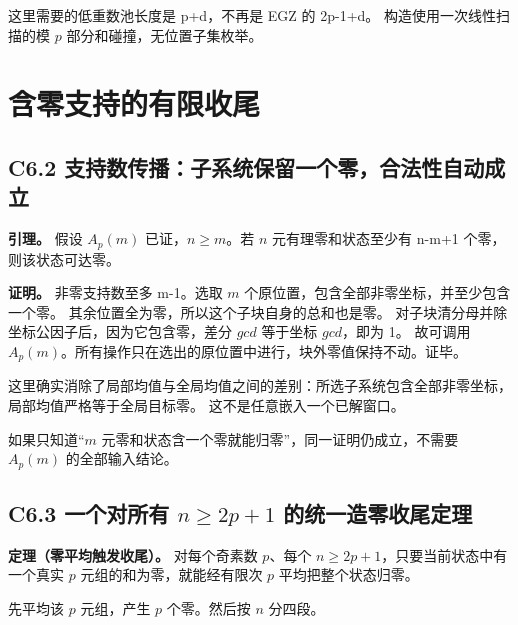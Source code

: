 {这里需要的低重数池长度是} {p+d，不再是} {EGZ} {的} {2p-1+d。} {构造使用一次线性扫描的模} {\ensuremath{p}} {部分和碰撞，无位置子集枚举。}


\section{含零支持的有限收尾}\label{construct:zero-tail}
\subsection*{\texorpdfstring{{C6.2} {支持数传播：子系统保留一个零，合法性自动成立}}{C6.2 支持数传播：子系统保留一个零，合法性自动成立}}\label{C6-h34}

\textbf{{引理。}} {假设} {\ensuremath{A_{p}(m)}} {已证，\ensuremath{n\ge m}。若} {\ensuremath{n}} {元有理零和状态至少有} {n-m+1} {个零，则该状态可达零。}

\textbf{{证明。}} {非零支持数至多} {m-1。选取} {\ensuremath{m}} {个原位置，包含全部非零坐标，并至少包含一个零。} {其余位置全为零，所以这个子块自身的总和也是零。} {对子块清分母并除坐标公因子后，因为它包含零，差分} {\ensuremath{gcd}} {等于坐标} {\ensuremath{gcd}，即为} {1。} {故可调用} {\ensuremath{A_{p}(m)}。所有操作只在选出的原位置中进行，块外零值保持不动。证毕。}

{这里确实消除了局部均值与全局均值之间的差别：所选子系统包含全部非零坐标，局部均值严格等于全局目标零。} {这不是任意嵌入一个已解窗口。}

{如果只知道``\ensuremath{m}} {元零和状态含一个零就能归零''，同一证明仍成立，不需要} {\ensuremath{A_{p}(m)}} {的全部输入结论。}

\subsection*{\texorpdfstring{{C6.3} {一个对所有} {\ensuremath{n\ge 2p+1}} {的统一造零收尾定理}}{C6.3 一个对所有  的统一造零收尾定理}}\label{C6-h35}

\textbf{{定理（零平均触发收尾）。}} {对每个奇素数} {\ensuremath{p}、每个} {\ensuremath{n\ge 2p+1}，只要当前状态中有一个真实} {\ensuremath{p}} {元组的和为零，就能经有限次} {\ensuremath{p}} {平均把整个状态归零。}

{先平均该} {\ensuremath{p}} {元组，产生} {\ensuremath{p}} {个零。然后按} {\ensuremath{n}} {分四段。}

